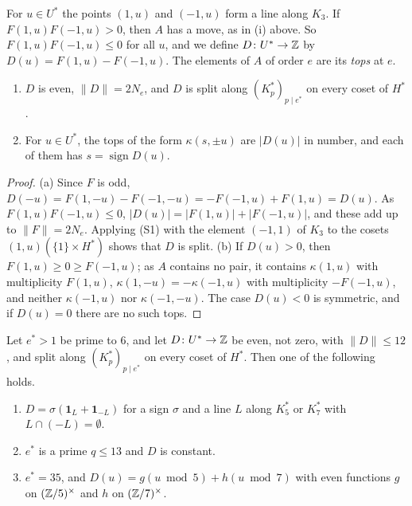 For $u\in U^{*}$ the points $(1,u)$ and $(-1,u)$ form a line along $K_{3}$.
If $F(1,u)F(-1,u)>0$, then $A$ has a move, as in (i) above. So
$F(1,u)F(-1,u)\le0$ for all $u$, and we define $D\colon U^{*}\to\mathbb{Z}$ by
$D(u)=F(1,u)-F(-1,u)$. The elements of $A$ of order $e$ are its \emph{tops}
at $e$.

\begin{lemma}\label{lem:tops}
\begin{enumerate}[label=\textup{(\alph*)}]
\item $D$ is even, $\|D\|=2N_{e}$, and $D$ is split along
$(K^{*}_{p})_{p\mid e^{*}}$ on every coset of $H^{*}$.
\item For $u\in U^{*}$, the tops of the form $\kappa(s,\pm u)$ are $|D(u)|$
in number, and each of them has $s=\operatorname{sign}D(u)$.
\end{enumerate}
\end{lemma}

\begin{proof}
(a) Since $F$ is odd, $D(-u)=F(1,-u)-F(-1,-u)=-F(-1,u)+F(1,u)=D(u)$. As
$F(1,u)F(-1,u)\le0$, $|D(u)|=|F(1,u)|+|F(-1,u)|$, and these add up to
$\|F\|=2N_{e}$. Applying (S1) with the element $(-1,1)$ of $K_{3}$ to the
cosets $(1,u)(\{1\}\times H^{*})$ shows that $D$ is split. (b) If $D(u)>0$,
then $F(1,u)\ge0\ge F(-1,u)$; as $A$ contains no pair, it contains
$\kappa(1,u)$ with multiplicity $F(1,u)$, $\kappa(1,-u)=-\kappa(-1,u)$ with
multiplicity $-F(-1,u)$, and neither $\kappa(-1,u)$ nor $\kappa(-1,-u)$. The
case $D(u)<0$ is symmetric, and if $D(u)=0$ there are no such tops.
\end{proof}

\begin{lemma}\label{lem:even}
Let $e^{*}>1$ be prime to $6$, and let $D\colon U^{*}\to\mathbb{Z}$ be even, not
zero, with $\|D\|\le12$, and split along $(K^{*}_{p})_{p\mid e^{*}}$ on every
coset of $H^{*}$. Then one of the following holds.
\begin{enumerate}[label=\textup{(E\arabic*)}]
\item $D=\sigma(\mathbf 1_{L}+\mathbf 1_{-L})$ for a sign $\sigma$ and a
line $L$ along $K^{*}_{5}$ or $K^{*}_{7}$ with $L\cap(-L)=\emptyset$.
\item $e^{*}$ is a prime $q\le13$ and $D$ is constant.
\item $e^{*}=35$, and $D(u)=g(u\bmod5)+h(u\bmod7)$ with even functions $g$
on $(\mathbb{Z}/5)^{\times}$ and $h$ on $(\mathbb{Z}/7)^{\times}$.
\end{enumerate}
\end{lemma}

